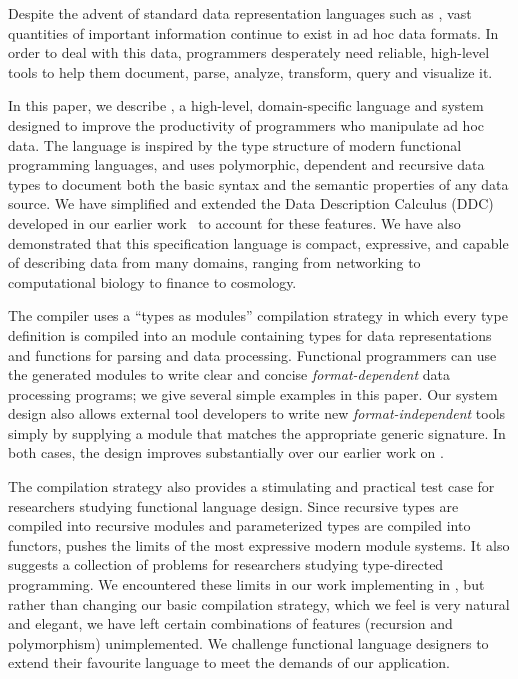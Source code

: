 Despite the advent of standard data representation languages such as
\xml, vast quantities of important information continue to exist
in ad hoc data formats.  In order to deal with this data,
programmers desperately need reliable, high-level tools to 
help them document, parse, 
analyze, transform, query and visualize it.  

In this paper, we describe \padsml{}, 
a high-level, domain-specific language and system
designed to improve the productivity of programmers who 
manipulate ad hoc data.  The \padsml{} 
language is inspired by the type structure of modern functional
programming languages, and uses 
polymorphic, dependent and recursive data types to document both the
basic syntax and the semantic properties of any data source.  
We have simplified and extended the Data Description Calculus (DDC) 
developed in
our earlier work~\cite{fisher+:next700ddl} to account for these features.
We have also demonstrated that this specification language
is compact, expressive, and 
capable of describing data from many domains, ranging from
networking to computational biology to finance to cosmology.

The \padsml{} compiler uses a ``types as modules'' compilation strategy
in which every \padsml{} type definition is compiled into
an \ocaml{} module containing types for data representations
and functions for parsing and data processing.  Functional programmers
can use the generated modules to write clear and concise {\em format-dependent}
data processing programs;
we give several simple examples in this paper.  Our system design
also allows external
tool developers to write new {\em format-independent} tools
simply by supplying a module that matches the appropriate generic
signature.  In both cases, the design improves substantially over
our earlier work on \padsc{}.

The \padsml{} compilation strategy also provides a stimulating and
practical test case for researchers studying functional language
design.  Since recursive types are compiled into recursive modules and
parameterized types are compiled into functors, \padsml{} pushes the
limits of the most expressive modern module systems.  It also suggests
a collection of problems for researchers studying type-directed
programming.  We encountered these limits in our work implementing
\padsml{} in
\ocaml, but rather than changing
our basic compilation strategy, which we feel is very natural and elegant,
we have left certain combinations of features (recursion and polymorphism)
unimplemented.
We challenge functional language designers to extend their favourite
language to meet the demands of our application.


